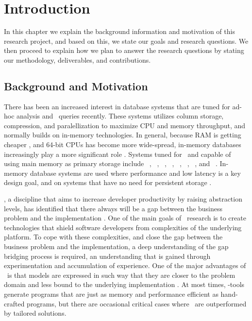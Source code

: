 \chapter{Introduction}
\label{chap:introduction}
In this chapter we explain the background information and motivation of this research project, and based on this, we state our goals and research questions. We then proceed to explain how we plan to answer the research questions by stating our methodology, deliverables, and contributions.
\clearpage

\section{Background and Motivation}
\label{sec:Background and Motivation}
There has been an increased interest in database systems that are tuned for ad-hoc analysis and \bi~queries recently. These systems utilizes column storage, compression, and paralellization to maximize CPU and memory throughput, and normally builds on in-memory technologies. In general, because RAM is getting cheaper \cite{Exasol2014-xh}, and 64-bit CPUs has become more wide-spread, in-memory databases increasingly play a more significant role \cite{Delaney2014-ip}. Systems tuned for \bi~and capable of using main memory as primary storage include \oracle~\cite{Lahiri2015-mz}, \saph~\cite{Farber2012-vh}, \gorilla~\cite{Pelkonen2015-ko}, \qlikview~\cite{Qlik2011-ef}, \tableau~\cite{Kamkolkar2015-iq}, \monetdb~\cite{Boncz2002-yj}, \blink~\cite{Barber2012-xt}, and \sapnw~\cite{Lemke2010-is}. In-memory database systems are used where performance and low latency is a key design goal, and on systems that have no need for persistent storage \cite{Zicari2012-is}.

\mde, a discipline that aims to increase developer productivity by raising abstraction levels, has identified that there always will be a gap between the business problem and the implementation \cite{France2007-ae}. One of the main goals of \mdd~research is to create technologies that shield software developers from complexities of the underlying platform. To cope with these complexities, and close the gap between the business problem and the implementation, a deep understanding of the gap bridging process is required, an understanding that is gained through experimentation and accumulation of experience. One of the major advantages of \mde~is that models are expressed in such way that they are closer to the problem domain and less bound to the underlying implementation \cite{Selic2003-qa}. At most times, \mdd-tools generate programs that are just as memory and performance efficient as hand-crafted programs, but there are occasional critical cases where \mde~are outperformed by tailored solutions.

